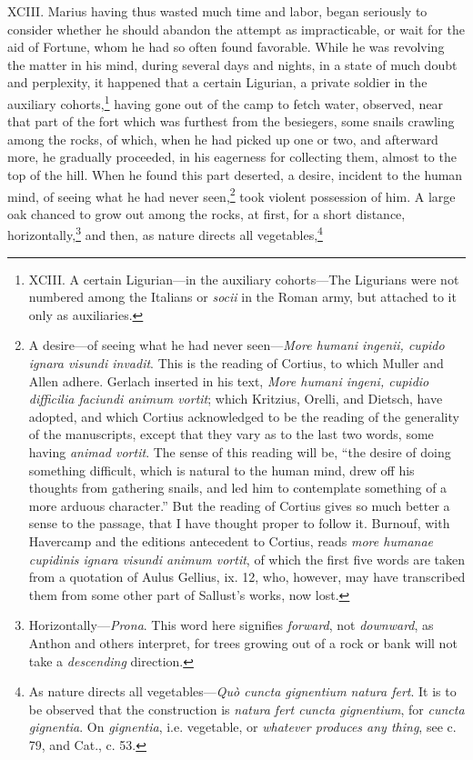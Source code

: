 XCIII. Marius having thus wasted much time and labor, began seriously
to consider whether he should abandon the attempt as impracticable, or
wait for the aid of Fortune, whom he had so often found favorable.
While he was revolving the matter in his mind, during several days and
nights, in a state of much doubt and perplexity, it happened that a
certain Ligurian, a private soldier in the auxiliary cohorts,\footnote{XCIII. A certain Ligurian—in the auxiliary cohorts—The
Ligurians were not numbered among the Italians or \emph{socii} in the Roman
army, but attached to it only as auxiliaries.}
having gone out of the camp to fetch water, observed, near that part
of the fort which was furthest from the besiegers, some snails
crawling among the rocks, of which, when he had picked up one or two,
and afterward more, he gradually proceeded, in his eagerness for
collecting them, almost to the top of the hill. When he found this
part deserted, a desire, incident to the human mind, of seeing what he
had never seen,\footnote{A desire—of seeing what he had never seen—\emph{More humani
ingenii, cupido ignara visundi invadit}. This is the reading of
Cortius, to which Muller and Allen adhere. Gerlach inserted in his
text, \emph{More humani ingeni, cupidio difficilia faciundi animum vortit};
which Kritzius, Orelli, and Dietsch, have adopted, and which Cortius
acknowledged to be the reading of the generality of the manuscripts,
except that they vary as to the last two words, some having
\emph{animad vortit}. The sense of this reading will be, ``the desire of
doing something difficult, which is natural to the human mind, drew
off his thoughts from gathering snails, and led him to contemplate
something of a more arduous character.'' But the reading of Cortius
gives so much better a sense to the passage, that I have thought
proper to follow it. Burnouf, with Havercamp and the editions
antecedent to Cortius, reads \emph{more humanae cupidinis ignara visundi
animum vortit}, of which the first five words are taken from a
quotation of Aulus Gellius, ix. 12, who, however, may have transcribed
them from some other part of Sallust's works, now lost.} took violent possession of him. A large oak
chanced to grow out among the rocks, at first, for a short distance,
horizontally,\footnote{Horizontally—\emph{Prona}. This word here signifies \emph{forward}, not
\emph{downward}, as Anthon and others interpret, for trees growing out
of a rock or bank will not take a \emph{descending} direction.} and then, as nature directs all vegetables,\footnote{As nature directs all vegetables—\emph{Quò cuncta gignentium
natura fert}. It is to be observed that the construction is \emph{natura
fert cuncta gignentium}, for \emph{cuncta gignentia}. On \emph{gignentia}, i.e.
vegetable, or \emph{whatever produces any thing}, see c. 79, and Cat., c.
53.}
